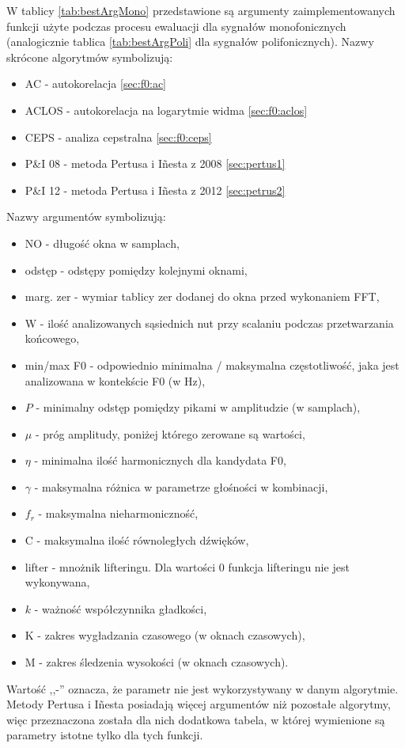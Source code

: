 \documentclass[12pt,a4paper,twoside]{mwart}
\begin{document}
W tablicy \ref{tab:bestArgMono} przedstawione są argumenty zaimplementowanych funkcji użyte podczas procesu ewaluacji dla sygnałów monofonicznych (analogicznie tablica \ref{tab:bestArgPoli} dla sygnałów polifonicznych). Nazwy skrócone algorytmów symbolizują: 
\begin{itemize}
  \item AC - autokorelacja \ref{sec:f0:ac}
  \item ACLOS - autokorelacja na logarytmie widma \ref{sec:f0:aclos}
  \item CEPS - analiza cepstralna \ref{sec:f0:ceps}
  \item P\&I 08 - metoda Pertusa i Iñesta z 2008 \ref{sec:pertus1}
  \item P\&I 12 - metoda Pertusa i Iñesta z 2012 \ref{sec:petrus2}
\end{itemize}
Nazwy argumentów symbolizują:
\begin{itemize}
  \item NO - długość okna w samplach,
  \item odstęp - odstępy pomiędzy kolejnymi oknami,
  \item marg. zer - wymiar tablicy zer dodanej do okna przed wykonaniem FFT,
  \item W - ilość analizowanych sąsiednich nut przy scalaniu podczas przetwarzania końcowego,
  \item min/max F0 - odpowiednio minimalna / maksymalna częstotliwość, jaka jest analizowana w kontekście F0 (w Hz),
  \item $P$ - minimalny odstęp pomiędzy pikami w amplitudzie (w samplach),
  \item $\mu$ - próg amplitudy, poniżej którego zerowane są wartości,
  \item $\eta$ - minimalna ilość harmonicznych dla kandydata F0,
  \item $\gamma$ - maksymalna różnica w parametrze głośności w kombinacji,
  \item $f_r$ - maksymalna nieharmoniczność,
  \item C - maksymalna ilość równoległych dźwięków,
  \item lifter - mnożnik lifteringu. Dla wartości 0 funkcja lifteringu nie jest wykonywana,
  \item $k$ - ważność współczynnika gładkości,
  \item K - zakres wygładzania czasowego (w oknach czasowych),
  \item M - zakres śledzenia wysokości (w oknach czasowych).
\end{itemize}
Wartość ,,-'' oznacza, że parametr nie jest wykorzystywany w danym algorytmie. Metody Pertusa i Iñesta posiadają więcej argumentów niż pozostałe algorytmy, więc przeznaczona została dla nich dodatkowa tabela, w której wymienione są parametry istotne tylko dla tych funkcji.
\end{document}
